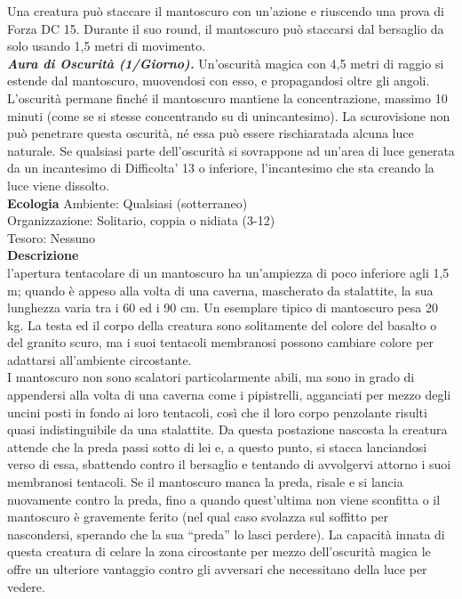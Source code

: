 \begin{multicols}{2}
Una creatura può staccare il mantoscuro con un'azione e riuscendo una prova di Forza DC  15. Durante il suo round, il mantoscuro può staccarsi dal bersaglio da solo usando 1,5 metri di movimento.\\
\emph{\textbf{Aura di Oscurità (1/Giorno).}} Un'oscurità magica con 4,5 metri di raggio si estende dal mantoscuro, muovendosi con esso, e propagandosi oltre gli angoli. L'oscurità permane finché il mantoscuro mantiene la concentrazione, massimo 10 minuti (come se si stesse concentrando su di unincantesimo). La scurovisione non può penetrare  questa oscurità, né essa può essere rischiaratada alcuna luce naturale. Se qualsiasi parte dell'oscurità si sovrappone ad un'area di  luce generata da un incantesimo di Difficolta' 13 o inferiore, l'incantesimo che sta creando la luce viene dissolto.\\
\textbf{Ecologia}
Ambiente: Qualsiasi (sotterraneo)\\
Organizzazione: Solitario, coppia o nidiata (3-12)\\
Tesoro: Nessuno\\
\textbf{Descrizione}\\
l'apertura tentacolare di un mantoscuro ha un'ampiezza di poco inferiore agli 1,5 m; quando è appeso alla volta di una caverna, mascherato da stalattite, la sua lunghezza varia tra i 60 ed i 90 cm. Un esemplare tipico di mantoscuro pesa 20 kg. La testa ed il corpo della creatura sono solitamente del colore del basalto o del granito scuro, ma i suoi tentacoli membranosi possono cambiare colore per adattarsi all'ambiente circostante.\\

I mantoscuro non sono scalatori particolarmente abili, ma sono in grado di appendersi alla volta di una caverna come i pipistrelli, agganciati per mezzo degli uncini posti in fondo ai loro tentacoli, così che il loro corpo penzolante risulti quasi indistinguibile da una stalattite. Da questa postazione nascosta la creatura attende che la preda passi sotto di lei e, a questo punto, si stacca lanciandosi verso di essa, sbattendo contro il bersaglio e tentando di avvolgervi attorno i suoi membranosi tentacoli. Se il mantoscuro manca la preda, risale e si lancia nuovamente contro la preda, fino a quando quest’ultima non viene sconfitta o il mantoscuro è gravemente ferito (nel qual caso svolazza sul soffitto per nascondersi, sperando che la sua “preda” lo lasci perdere). La capacità innata di questa creatura di celare la zona circostante per mezzo dell'oscurità magica le offre un ulteriore vantaggio contro gli avversari che necessitano della luce per vedere.\\


\end{multicols}
